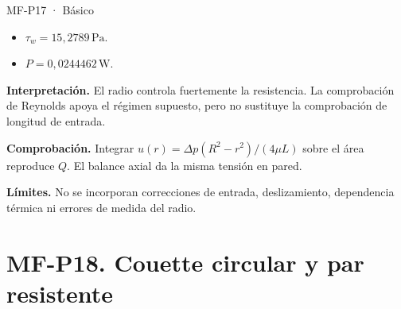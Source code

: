 \begin{studiumworked}{MF-P17 · Básico}
\begin{itemize}
\item $\tau_w=15{,}2789\,\mathrm{Pa}$.

\item $P=0{,}0244462\,\mathrm{W}$.

\end{itemize}

\textbf{Interpretación.} El radio controla fuertemente la resistencia. La comprobación de Reynolds apoya el régimen supuesto, pero no sustituye la comprobación de longitud de entrada.

\textbf{Comprobación.} Integrar $u(r)=\Delta p(R^2-r^2)/(4\mu L)$ sobre el área reproduce $Q$. El balance axial da la misma tensión en pared.

\textbf{Límites.} No se incorporan correcciones de entrada, deslizamiento, dependencia térmica ni errores de medida del radio.

\end{studiumworked}



\Needspace{.30\textheight}\section{MF-P18. Couette circular y par resistente}

